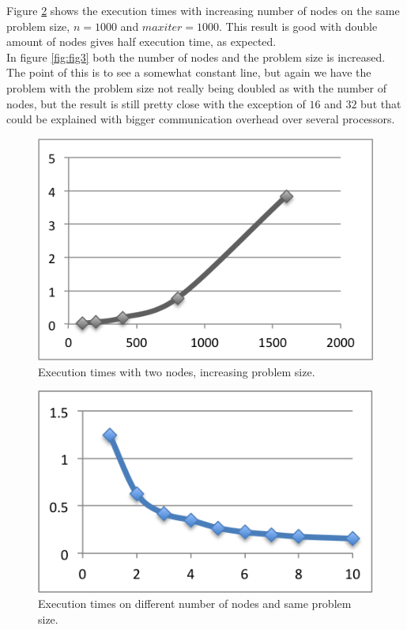 \documentclass[a4paper]{article}
\begin{document}
Figure \ref{fig:fig2} shows the execution times with increasing number of nodes on the same problem size, $n = 1000$ and $maxiter = 1000$. This result is good with double amount of nodes gives half execution time, as expected.\\

 In figure \ref{fig:fig3} both the number of nodes and the problem size is increased. The point of this is to see a somewhat constant line, but again we have the problem with the problem size not really being doubled as with the number of nodes, but the result is still pretty close with the exception of $16$ and $32$ but that could be explained with bigger communication overhead over several processors.
 
\begin{figure}
  \centering
  \includegraphics{samenodes.png}
  \caption{Execution times with two nodes, increasing problem size.}
  \label{fig:fig1}
\end{figure}

\begin{figure}
  \centering
  \includegraphics{lab3graph.png}
  \caption{Execution times on different number of nodes and same problem size.}
  \label{fig:fig2}
\end{figure}
\end{document}
